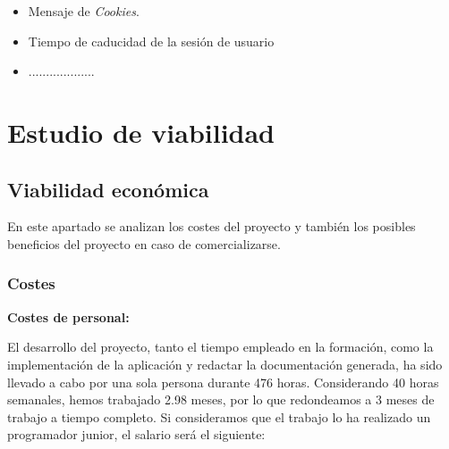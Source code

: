 \begin{itemize}
\item Mensaje de \emph{Cookies}.

\item Tiempo de caducidad de la sesión de usuario

\item ...................
\end{itemize}


\section{Estudio de viabilidad}

\subsection{Viabilidad económica}

En este apartado se analizan los costes del proyecto y también los posibles  beneficios del proyecto en caso de comercializarse.

\subsubsection{Costes}
\textbf{Costes de personal:}

El desarrollo del proyecto, tanto el tiempo empleado en la formación, como la implementación de la aplicación y redactar la documentación
generada, ha sido llevado a cabo por una sola persona durante 476 horas. Considerando 40 horas semanales, hemos trabajado 2.98  meses, por lo que redondeamos a 3 meses de trabajo a tiempo completo. Si consideramos que el trabajo lo ha realizado un programador junior, el salario será el siguiente:


